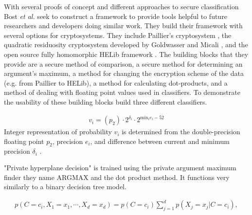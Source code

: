 \documentclass[]{article}
\begin{document}
With several proofs of concept and different approaches to secure classification Bost \emph{et al.} \cite{Bost2015}
seek to construct a framework to provide tools helpful to future researchers and developers doing similar work.
They build their framework with several options for cryptosystems.
They include Paillier's cryptosystem \cite{Paillier1999},
the quadratic residuosity cryptosystem developed by Goldwasser and Micali \cite{Goldwasser1982},
and the open source fully homomorphic HELib framework \cite{Helib2013}. 
The building blocks that they provide are 
a secure method of comparison, 
a secure method for determining an argument's maximum, 
a method for changing the encryption scheme of the data (e.g. from Paillier to HELib), 
a method for calculating dot-products, 
and a method of dealing with floating point values used in classifiers.  %
To demonstrate the usability of these building blocks \cite{Bost2015} build three different classifiers. 

\begingroup
\begin{framed}	
	\begin{align*}
	  v_i = (p_2) \cdot 2^{\delta_i} \cdot 2^{\text{min}_ie_i - 52}
	\end{align*}
	Integer representation of probability
	$v_i$ is determined from the double-precision floating point $p_2$,
	precision $e_i$, and 
	difference between current and minimum precision $\delta_i$ .
\end{framed}
\vspace{-1.25em}
\vspace{1.5em}
\endgroup

"Private hyperplane decision" is trained using the private argument maximum finder they name ARGMAX and the dot product method.
It functions very similarly to a binary decision tree model.

\begingroup
\setlength{\FrameSep}{-0.5em}
\begin{framed}	
	\begin{align*}
	p(C = c_i,X_1 = x_1,\cdots,X_d = x_d) = p(C = c_i)
	\sum_{j=1}^{d}
	p(X_j = x_j|C = c_i),
	\end{align*}
\end{framed}
\vspace{-1.25em}
\vspace{1.5em}
\endgroup
\end{document}
